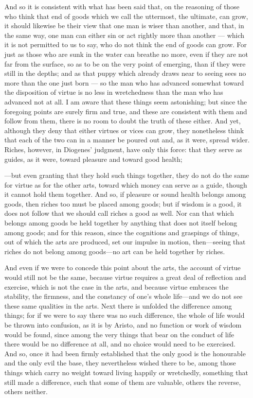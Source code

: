  And so it is consistent with what has been said that, on the reasoning of those who think that end of goods which we call the uttermost, the ultimate, can grow, it should likewise be their view that one man is wiser than another, and that, in the same way, one man can either sin or act rightly more than another — which it is not permitted to us to say, who do not think the end of goods can grow. For just as those who are sunk in the water can breathe no more, even if they are not far from the surface, so as to be on the very point of emerging, than if they were still in the depths; and as that puppy which already draws near to seeing sees no more than the one just born — so the man who has advanced somewhat toward the disposition of virtue is no less in wretchedness than the man who has advanced not at all. I am aware that these things seem astonishing; but since the foregoing points are surely firm and true, and these are consistent with them and follow from them, there is no room to doubt the truth of these either. And yet, although they deny that either virtues or vices can grow, they nonetheless think that each of the two can in a manner be poured out and, as it were, spread wider. Riches, however, in Diogenes' judgment, have only this force: that they serve as guides, as it were, toward pleasure and toward good health;

 —but even granting that they hold such things together, they do not do the same for virtue as for the other arts, toward which money can serve as a guide, though it cannot hold them together. And so, if pleasure or sound health belongs among goods, then riches too must be placed among goods; but if wisdom is a good, it does not follow that we should call riches a good as well. Nor can that which belongs among goods be held together by anything that does not itself belong among goods; and for this reason, since the cognitions and graspings of things, out of which the arts are produced, set our impulse in motion, then—seeing that riches do not belong among goods—no art can be held together by riches.

 And even if we were to concede this point about the arts, the account of virtue would still not be the same, because virtue requires a great deal of reflection and exercise, which is not the case in the arts, and because virtue embraces the stability, the firmness, and the constancy of one's whole life—and we do not see these same qualities in the arts. Next there is unfolded the difference among things; for if we were to say there was no such difference, the whole of life would be thrown into confusion, as it is by Aristo, and no function or work of wisdom would be found, since among the very things that bear on the conduct of life there would be no difference at all, and no choice would need to be exercised. And so, once it had been firmly established that the only good is the honourable and the only evil the base, they nevertheless wished there to be, among those things which carry no weight toward living happily or wretchedly, something that still made a difference, such that some of them are valuable, others the reverse, others neither.

